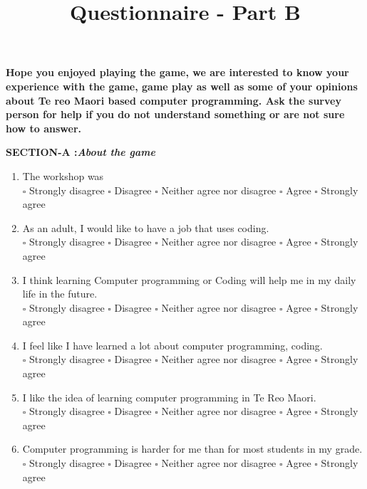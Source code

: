 \documentclass[12pt]{article}\pagestyle{myheadings}
\title{Questionnaire - Part B}
\theoremstyle{plain}
\begin{document}
\begin{mdframed}

\textbf{Hope you enjoyed playing the game, we are interested to know your experience with the game, game play as well as some of your opinions about Te reo Maori based computer programming. Ask the survey person for help if you do not understand something or are not sure how to answer.}

\end{mdframed}
\textbf{ SECTION-A :\textit{About the game}}
\begin{mdframed}
\begin{enumerate}


\item The workshop was \\
$\square$ Strongly disagree $\square$ Disagree $\square$ Neither agree nor disagree $\square$ Agree $\square$ Strongly agree


\item As an adult, I would like to have a job that uses coding. \\ 
$\square$ Strongly disagree $\square$ Disagree $\square$ Neither agree nor disagree $\square$ Agree $\square$ Strongly agree


\item I think learning Computer programming or Coding will help me in my daily life in the future.\\
$\square$ Strongly disagree $\square$ Disagree $\square$ Neither agree nor disagree $\square$ Agree $\square$ Strongly agree


\item I feel like I have learned a lot about computer programming, coding. \\
$\square$ Strongly disagree $\square$ Disagree $\square$ Neither agree nor disagree $\square$ Agree $\square$ Strongly agree


\item I like the idea of learning computer programming in Te Reo Maori.\\
$\square$ Strongly disagree $\square$ Disagree $\square$ Neither agree nor disagree $\square$ Agree $\square$ Strongly agree


\item Computer programming is harder for me than for most students in my grade.\\
$\square$ Strongly disagree $\square$ Disagree $\square$ Neither agree nor disagree $\square$ Agree $\square$ Strongly agree





\end{enumerate}
\end{mdframed}
\end{document}

